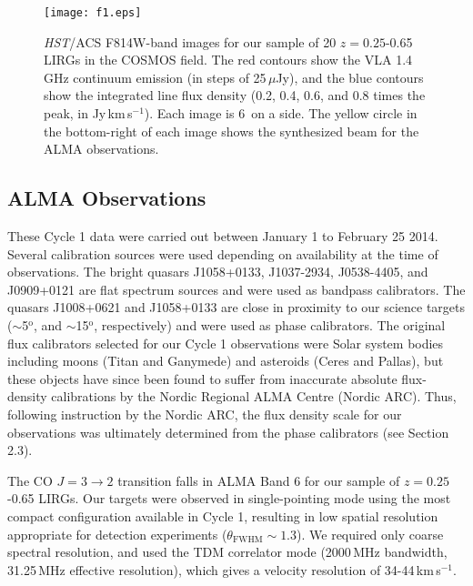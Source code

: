 \documentclass[a4paper,fleqn,usenatbib]{mnras}
\newcommand{\tbd}{{\bf TBD}}
\newcommand{\degree}{$^\mathrm{o}$}
\begin{document}
\begin{figure*}
\begin{center}
\texttt{[image: f1.eps]}
\caption{{\it HST}/ACS F814W-band images for our sample of 20 $z =0.25$-0.65 LIRGs in the COSMOS field. The red contours show the VLA 1.4\,GHz continuum emission (in steps of 25\,$\mu$Jy), and the blue contours show the integrated line flux density (0.2, 0.4, 0.6, and 0.8 times the peak, in Jy\,km\,s$^{-1}$). Each image is 6\arcsec\ on a side. The yellow circle in the bottom-right of each image shows the synthesized beam for the ALMA observations.}
\label{fig:pstamps}
\end{center}
\end{figure*}

\subsection{ALMA Observations}
\label{ssec:almaobs}

These Cycle 1 data were carried out between January 1 to February 25 2014. Several calibration sources were used depending on availability at the time of observations. The bright quasars J1058+0133, J1037-2934, J0538-4405, and J0909+0121 are flat spectrum sources and were used as bandpass calibrators. The quasars J1008+0621 and J1058+0133 are close in proximity to our science targets ($\sim$5\degree, and $\sim$15\degree, respectively) and were used as phase calibrators. The original flux calibrators selected for our Cycle 1 observations were Solar system bodies including moons (Titan and Ganymede) and asteroids (Ceres and Pallas), but these objects have since been found to suffer from inaccurate absolute flux-density calibrations by the Nordic Regional ALMA Centre (Nordic ARC). Thus, following instruction by the Nordic ARC, the flux density scale for our observations was ultimately determined from the phase calibrators (see Section 2.3). %


The CO $J=3\rightarrow2$ transition falls in ALMA Band 6 for our sample of $z = 0.25$-0.65 LIRGs. Our targets were observed in single-pointing mode using the most compact configuration available in Cycle 1, resulting in low spatial resolution appropriate for detection experiments ($\theta_{\mathrm{FWHM}} \sim 1.3$\arcsec). We required only coarse spectral resolution, and used the TDM correlator mode (2000\,MHz bandwidth, 31.25\,MHz effective resolution), which gives a velocity resolution of 34-44\,km\,s$^{-1}$.
\end{document}
